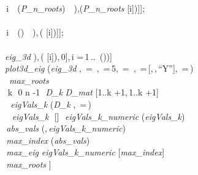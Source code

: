 \documentclass{article}
\begin{document}
{  \coloneqq []\colon 
\\
  \coloneqq []\colon 
\\
 \,i \,\, (\textit{P\_n\_roots})\, \, \coloneqq [\mathit{op} (\mathit{points}),\,[\Re (\textit{P\_n\_roots} [i]),\Im (\textit{P\_n\_roots} [i])]];
\\
 \,\colon 
\\
 \,i \,\, ()\, \, \coloneqq [\mathit{op} (\mathit{eig}),\,[\Re (\mathit{eigVals} [i]),\,\Im ( [i])]];
\\
 \,\colon 
\\
  \textit{eig\_3d} \coloneqq [\mathit{seq} ([\Re (\mathit{eigVals} [i]),\,\Im ( [i]),\,0],\,i =\,1\,..\, ())]\colon 
\\
 \textit{plot3d\_eig} \coloneqq {} (\textit{eig\_3d} ,\, =\, ,\, =\,5,\, =\, ,\, =\,[,\,,\,``Y''],\, =\,)\colon 
\\
 \, \textit{max\_roots} \coloneqq []\colon 
\\
 \,\,k \,\,0\,\,n -1\, \,\textit{D\_k} \coloneqq \textit{D\_mat} [1..k +1,\,1..k +1]\colon 
\\
 \, \,\textit{eigVals\_k} \coloneqq {} (\textit{D\_k} ,\, =\,)\colon 
\\
 \, \,\,\textit{eigVals\_k} \,\neq \,[]\, \,\textit{eigVals\_k\_numeric} \coloneqq {} (\textit{eigVals\_k})\colon 
\\
 \,\textit{abs\_vals} \coloneqq {} (,\,\textit{eigVals\_k\_numeric})\colon 
\\
 \,\textit{max\_index} \coloneqq {}(\textit{abs\_vals})\colon 
\\
 \,\textit{max\_eig} \coloneqq \textit{eigVals\_k\_numeric} [\textit{max\_index}]\colon 
\\
 \,\textit{max\_roots} \coloneqq [\mathit{op} (\textit{max\_roots}),\,[\Re (\textit{max\_eig}),\,\Im (\textit{max\_eig})]]\colon 
\\
 \,\,\colon 
\\
 \,\,\colon 
}
\end{document}
